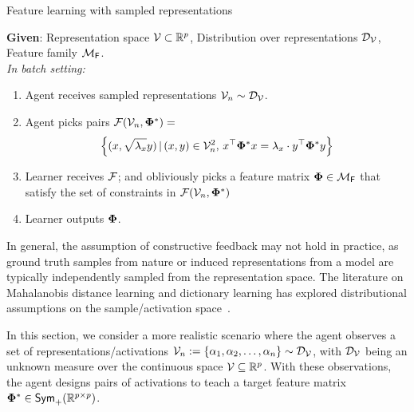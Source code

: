 \begin{algorithm}[t]
\caption{Feature learning with sampled representations}
\label{alg: randmaha}
\textbf{Given}: Representation space ${\mathcal{V}}  \subset \mathbb{R}^p$, Distribution over representations ${\mathcal{D}}_{\mathcal{V}}$, Feature family ${\mathcal{M}}_{\mathsf{F}}$. \vspace{2mm}\\
\textit{In batch setting:}%
\begin{enumerate}
    \item Agent receives sampled representations ${\mathcal{V}}_n \sim {\mathcal{D}}_{{\mathcal{V}}}$.\vspace{-2mm}
    \item Agent picks pairs ${\mathcal{F}}({\mathcal{V}}_n,\boldsymbol{\Phi}^*) =$ \vspace{-2mm}$$\curlybracket{(x,\sqrt{\lambda_{x}}y)\,|\, (x,y) \in \cV_n^2,\, x^{\top}\pphi^*x = \lambda_{x}\cdot y^{\top}\pphi^*y}\vspace{-2mm}$$ 
    \item Learner receives ${\mathcal{F}}$; and obliviously picks a feature matrix $\boldsymbol{\Phi} \in {\mathcal{M}}_{\mathsf{F}}$ that satisfy the set of constraints in ${\mathcal{F}}({\mathcal{V}}_n,\boldsymbol{\Phi}^*)$\vspace{-2mm}
    \item Learner outputs $\boldsymbol{\Phi}$.\vspace{-2mm}
\end{enumerate}
\end{algorithm}

In general, the assumption of constructive feedback may not hold in practice, as ground truth samples from nature or induced representations from a model are typically independently sampled from the representation space. The literature on Mahalanobis distance learning and dictionary learning has explored distributional assumptions on the sample/activation space~\citep{Mason2017LearningLM,Gribonval2014SparseAS}.

In this section, we consider a more realistic scenario where the agent observes a set of representations/activations ${\mathcal{V}}_n := \{\alpha_1, \alpha_2, \ldots, \alpha_n\} \sim {\mathcal{D}}_{{\mathcal{V}}}$, with ${\mathcal{D}}_{{\mathcal{V}}}$ being an unknown measure over the continuous space ${\mathcal{V}} \subseteq \mathbb{R}^p$. With these observations, the agent designs pairs of activations to teach a target feature matrix $\boldsymbol{\Phi}^* \in \textsf{Sym}_{+}(\mathbb{R}^{p\times p})$.

